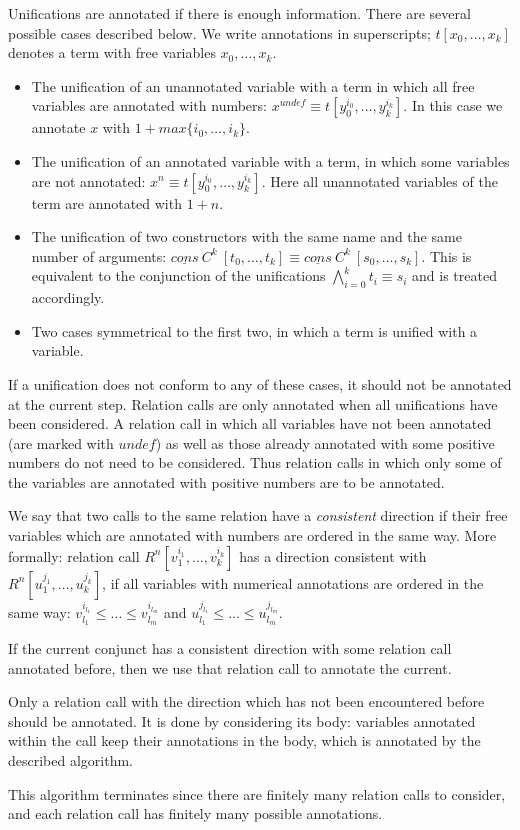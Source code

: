 \documentclass[submission,copyright,creativecommons]{eptcs}
\begin{document}
Unifications are annotated if there is enough information.
There are several possible cases described below.
We write annotations in superscripts; $t[x_0, \dots, x_k]$ denotes a term with free variables $x_0, \dots, x_k$.
\begin{itemize}
  \item The unification of an unannotated variable with a term in which all free variables are annotated with numbers: $x^{undef} \equiv t[y_0^{i_0},\dots, y_k^{i_k}]$. In this case we annotate $x$ with $1+max\{i_0,\dots,i_k\}$.
  \item The unification of an annotated variable with a term, in which some variables are not annotated: $x^{n} \equiv t[y_0^{i_0},\dots, y_k^{i_k}]$. Here all unannotated variables of the term are annotated with $1+n$.
  \item The unification of two constructors with the same name and the same number of arguments: $\underline{cons} \ C^k \ [t_0, \dots, t_k] \equiv \underline{cons} \ C^k \ [s_0, \dots, s_k]$. This is equivalent to the conjunction of the unifications $\bigwedge_{i=0}^{k} t_i \equiv s_i$ and is treated accordingly.
  \item Two cases symmetrical to the first two, in which a term is unified with a variable.
\end{itemize}

If a unification does not conform to any of these cases, it should not be annotated at the current step.
Relation calls are only annotated when all unifications have been considered.
A relation call in which all variables have not been annotated (are marked with $undef$) as well as those already annotated with some positive numbers do not need to be considered.
Thus relation calls in which only some of the variables are annotated with positive numbers are to be annotated.

We say that two calls to the same relation have a \emph{consistent} direction if their free variables which are annotated with numbers are ordered in the same way.
More formally: relation call $R^n [v_1^{i_1}, \dots, v_k^{i_k}]$ has a direction consistent with $R^n [u_1^{j_1}, \dots, u_k^{j_k}]$, if all variables with numerical annotations are ordered in the same way: $v_{l_1}^{i_{l_1}} \leq \dots \leq v_{l_m}^{i_{l_m}}$ and $u_{l_1}^{j_{l_1}} \leq \dots \leq u_{l_m}^{j_{l_m}}$.

If the current conjunct has a consistent direction with some relation call annotated before, then we use that relation call to annotate the current.

Only a relation call with the direction which has not been encountered before should be annotated.
It is done by considering its body: variables annotated within the call keep their annotations in the body, which is annotated by  the described algorithm.

This algorithm terminates since there are finitely many relation calls to consider, and each relation call has finitely many possible annotations.


\nocite{*}


\end{document}
